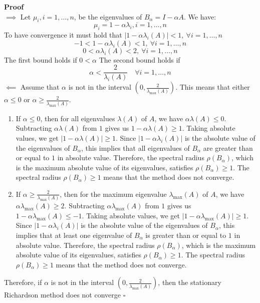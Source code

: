 \documentclass[11pt]{book}
\begin{document}
\textbf{Proof}\\
$\implies$ Let $\mu_i, i=1, \ldots, n$, be the eigenvalues of $B_\alpha=I-\alpha A$. We have:
$$
\mu_i=1-\alpha \lambda_i, i=1, \ldots, n
$$
To have convergence it must hold that $\left|1-\alpha \lambda_i(A)\right|<1, \ \forall i=1, \ldots, n$
$$
-1<1-\alpha \lambda_i(A)<1, \  \forall i=1, \ldots, n
$$
$$
0<\alpha \lambda_i(A)<2, \  \forall i=1, \ldots, n
$$
The first bound holds if $0<\alpha$
The second bound holds if
$$
\alpha<\frac{2}{\lambda_i(A)} \quad \forall i=1, \ldots, n
$$
$\impliedby$ Assume that $\alpha$ is not in the interval $(0, \frac{2}{\lambda_{\text{max}}(A)})$. This means that either $\alpha \leq 0$ or $\alpha \geq \frac{2}{\lambda_{\text{max}}(A)}$.
\begin{enumerate}
\item If $\alpha \leq 0$, then for all eigenvalues $\lambda(A)$ of $A$, we have $\alpha\lambda(A) \leq 0$. Subtracting $\alpha\lambda(A)$ from $1$ gives us $1 - \alpha\lambda(A) \geq 1$. Taking absolute values, we get $|1 - \alpha\lambda(A)| \geq 1$. Since $|1 - \alpha\lambda_i(A)|$ is the absolute value of the eigenvalues of $B_\alpha$, this implies that all eigenvalues of $B_\alpha$ are greater than or equal to $1$ in absolute value. Therefore, the spectral radius $\rho(B_\alpha)$, which is the maximum absolute value of its eigenvalues, satisfies $\rho(B_\alpha) \geq 1$. The spectral radius $\rho(B_\alpha) \geq 1$ means that the method does not converge.\\
\item If $\alpha \geq \frac{2}{\lambda_{\text{max}}(A)}$, then for the maximum eigenvalue $\lambda_{\text{max}}(A)$ of $A$, we have $\alpha\lambda_{\text{max}}(A) \geq 2$. Subtracting $\alpha\lambda_{\text{max}}(A)$ from $1$ gives us $1 - \alpha\lambda_{\text{max}}(A) \leq -1$. Taking absolute values, we get $|1 - \alpha\lambda_{\text{max}}(A)| \geq 1$. Since $|1 - \alpha\lambda_i(A)|$ is the absolute value of the eigenvalues of $B_\alpha$, this implies that at least one eigenvalue of $B_\alpha$ is greater than or equal to $1$ in absolute value. Therefore, the spectral radius $\rho(B_\alpha)$, which is the maximum absolute value of its eigenvalues, satisfies $\rho(B_\alpha) \geq 1$. The spectral radius $\rho(B_\alpha) \geq 1$ means that the method does not converge.
\end{enumerate}
Therefore, if $\alpha$ is not in the interval $(0, \frac{2}{\lambda_{\text{max}}(A)})$, then the stationary Richardson method does not converge $\square$\\
\end{document}
